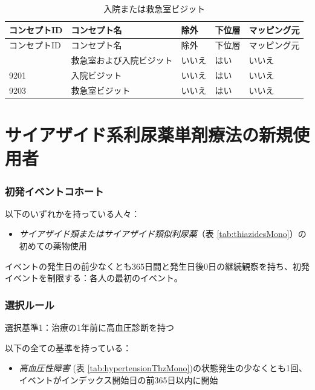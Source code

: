 \documentclass[
  11pt]{book}
\providecommand{\tightlist}{%
  \setlength{\itemsep}{0pt}\setlength{\parskip}{0pt}}
\theoremstyle{definition}
\theoremstyle{definition}
\theoremstyle{definition}
\theoremstyle{definition}
\theoremstyle{remark}
\begin{document}
\begin{longtable}[]{@{}lllll@{}}
\caption{\label{tab:inpatientOrEr} 入院または救急室ビジット}\tabularnewline
\toprule\noalign{}
コンセプトID & コンセプト名 & 除外 & 下位層 & マッピング元 \\
\midrule\noalign{}
\endfirsthead
\toprule\noalign{}
コンセプトID & コンセプト名 & 除外 & 下位層 & マッピング元 \\
\midrule\noalign{}
\endhead
\bottomrule\noalign{}
\endlastfoot
262 & 救急室および入院ビジット & いいえ & はい & いいえ \\
9201 & 入院ビジット & いいえ & はい & いいえ \\
9203 & 救急室ビジット & いいえ & はい & いいえ \\
\end{longtable}

\section{サイアザイド系利尿薬単剤療法の新規使用者}\label{ThiazidesMono}

\subsubsection*{初発イベントコホート}\label{ux521dux767aux30a4ux30d9ux30f3ux30c8ux30b3ux30dbux30fcux30c8-1}

以下のいずれかを持っている人々：

\begin{itemize}
\tightlist
\item
  \emph{サイアザイド類またはサイアザイド類似利尿薬}（表 \ref{tab:thiazidesMono}）の初めての薬物使用
\end{itemize}

イベントの発生日の前少なくとも365日間と発生日後0日の継続観察を持ち、初発イベントを制限する：各人の最初のイベント。

\subsubsection*{選択ルール}\label{ux9078ux629eux30ebux30fcux30eb-1}

選択基準1：治療の1年前に高血圧診断を持つ

以下の全ての基準を持っている：

\begin{itemize}
\tightlist
\item
  \emph{高血圧性障害} (表 \ref{tab:hypertensionThzMono})の状態発生の少なくとも1回、イベントがインデックス開始日の前365日以内に開始
\end{itemize}
\end{document}
